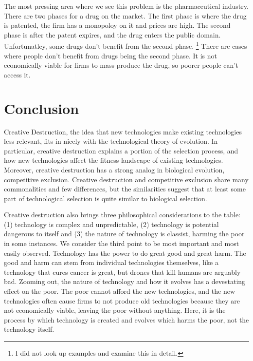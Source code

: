 \documentclass[11pt]{article}
\begin{document}
The most pressing area where we see this problem is the pharmaceutical industry.
There are two phases for a drug on the market. 
The first phase is where the drug is patented, the firm has a monopoloy on it and prices are high.
The second phase is after the patent expires, and the drug enters the public domain. 
Unfortunatley, some drugs don't benefit from the second phase. 
\footnote{I did not look up examples and examine this in detail.}
There are cases where people don't benefit from drugs being the second phase.
It is not economically viable for firms to mass produce the drug, so poorer people can't access it. 

\section{Conclusion}
Creative Destruction, the idea that new technologies make existing technologies less relevant, fits in nicely with the technological theory of evolution.
In particular, creative destruction explains a portion of the selection process, and how new technologies affect the fitness landscape of existing technologies.
Moreover, creative destruction has a strong analog in biological evolution, competitive exclusion.
Creative destruction and competitive exclusion share many commonalities and few differences, but the similarities suggest that at least some part of technological selection is quite similar to biological selection.

Creative destruction also brings three philosophical considerations to the table: (1) technology is complex and unpredictable, (2) technology is potential dangerous to itself and (3) the nature of technology is classist, harming the poor in some instances.
We consider the third point to be most important and most easily observed.
Technology has the power to do great good and great harm. 
The good and harm can stem from individual technologies themselves, like a technology that cures cancer is great, but drones that kill humans are arguably bad. 
Zooming out, the nature of technology and how it evolves has a devestating effect on the poor.
The poor cannot afford the new technologies, and the new technologies often cause firms to not produce old technologies because they are not economically viable, leaving the poor without anything. 
Here, it is the process by which technology is created and evolves which harms the poor, not the technology itself.



\end{document}
